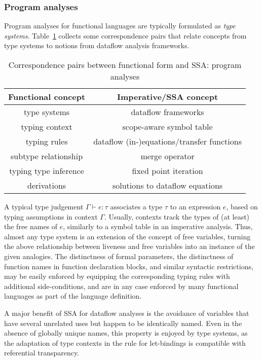 \subsubsection{Program analyses}
Program analyses for functional languages are typically formulated as
\emph{type systems}. Table~\ref{tableFunctionalCorrespondencesII} collects some
correspondence pairs that relate concepts from type systems to notions
from dataflow analysis frameworks.
\begin{table}
\begin{center}
\begin{tabular}{|c|c|}
  \hline Functional concept & Imperative/SSA concept\\ 
  \hline
  type systems & dataflow frameworks\\
  typing context & scope-aware symbol table\\
  typing
  rules & dataflow (in-)equations/transfer functions\\
  subtype relationship & merge operator\\
  typing
  type inference & fixed point iteration\\
  derivations & solutions to dataflow equations\\
  \hline
\end{tabular}
\end{center}
\caption{\label{tableFunctionalCorrespondencesII}
  Correspondence pairs between functional form and SSA: program analyses}
\end{table}
 A typical type judgement $\Gamma
\vdash e:\tau$ 
associates a type $\tau$ to an expression $e$, based on typing
assumptions in context $\Gamma$. Usually, contexts track the types of
(at least) the free names of $e$, similarly to a symbol table in an
imperative analysis. Thus, almost any type system is an extension of
the concept of free variables, turning the above relationship between
liveness and free variables into an instance of the given
analogies. The distinctness of formal parameters, the distinctness of
function names in function declaration blocks, and similar syntactic
restrictions, may be easily enforced by equipping the corresponding
typing rules with additional side-conditions, and are in any case
enforced by many functional languages as part of the language
definition.

A major benefit of SSA for dataflow analyses is the avoidance of
variables that have several unrelated uses but happen to be
identically named.  Even in the absence of globally unique names, this
property is enjoyed by type systems, as the adaptation of type
contexts in the rule for let-bindings is compatible with referential
transparency.

